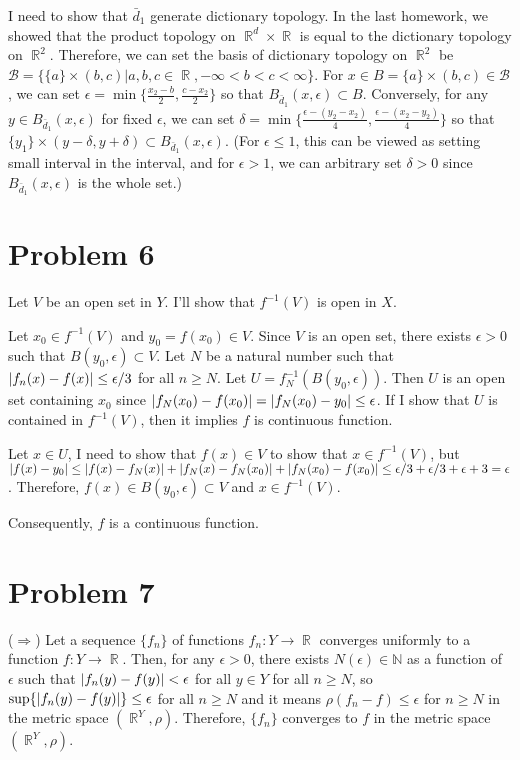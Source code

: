\documentclass{article}
\DeclareMathOperator{\rr}{\mathbb{R}}
\DeclarePairedDelimiter\abs{\lvert}{\rvert}%
\newcommand{\B}{\mathcal{B}}
\begin{document}
I need to show that $\bar{d}_1$ generate dictionary topology. In the last homework, we showed that the product topology on $\rr^d\times \rr$ is equal to the dictionary topology on $\rr^2$. Therefore, we can set the basis of dictionary topology on $\rr^2$ be $\B=\{\{a\}\times(b,c)|a,b,c\in\rr, -\infty<b<c<\infty\}$. For $x\in B=\{a\}\times(b,c)\in \B$, we can set $\epsilon=\min\{\frac{x_2-b}{2}, \frac{c-x_2}{2}\}$ so that $B_{\bar{d}_1}(x, \epsilon)\subset B$. Conversely, for any $y\in B_{\bar{d}_1}(x, \epsilon)$ for fixed $\epsilon$, we can set $\delta=\min\{\frac{\epsilon-(y_2-x_2)}{4}, \frac{\epsilon-(x_2-y_2)}{4}\}$ so that $\{y_1\}\times (y-\delta, y+\delta)\subset B_{\bar{d}_1}(x, \epsilon)$. (For $\epsilon\leq 1$, this can be viewed as setting small interval in the interval, and for $\epsilon>1$, we can arbitrary set $\delta>0$ since $B_{\bar{d}_1}(x, \epsilon)$ is the whole set.)

\section*{Problem 6}
Let $V$ be an open set in $Y$. I'll show that $f^{-1}(V)$ is open in $X$.

Let $x_0\in f^{-1}(V)$ and $y_0=f(x_0)\in V$. Since $V$ is an open set, there exists $\epsilon>0$ such that $B(y_0, \epsilon)\subset V$. Let $N$ be a natural number such that $\abs{f_n(x)-f(x)}\leq \epsilon/3$ for all $n\geq N$. Let $U=f^{-1}_N (B(y_0, \epsilon))$. Then $U$ is an open set containing $x_0$ since $\abs{f_N(x_0)-f(x_0)}=\abs{f_N(x_0)-y_0}\leq \epsilon$. If I show that $U$ is contained in $f^{-1}(V)$, then it implies $f$ is continuous function.

Let $x\in U$, I need to show that $f(x)\in V$ to show that $x\in f^{-1}(V)$, but $\abs{f(x)-y_0}\leq \abs{f(x)-f_N(x)}+\abs{f_N(x)-f_N(x_0)}+\abs{f_N(x_0)-f(x_0)}\leq \epsilon/3+\epsilon/3+\epsilon+3=\epsilon$. Therefore, $f(x)\in B(y_0,\epsilon)\subset V$ and $x\in f^{-1}(V)$.

Consequently, $f$ is a continuous function.
\section*{Problem 7}
($\Rightarrow$) Let a sequence $\{f_n\}$ of functions $f_n:Y\rightarrow\rr$ converges uniformly to a function $f:Y\rightarrow\rr$. Then, for any $\epsilon>0$, there exists $N(\epsilon)\in \mathbb{N}$ as a function of $\epsilon$ such that $\abs{f_n(y)-f(y)}< \epsilon$ for all $y\in Y$ for all $n\geq N$, so $\sup\{\abs{f_n(y)-f(y)}\}\leq \epsilon$ for all $n\geq N$ and it means $\rho(f_n-f)\leq \epsilon$ for $n\geq N$ in the metric space $(\rr^Y, \rho)$. Therefore, $\{f_n\}$ converges to $f$ in the metric space $(\rr^Y, \rho)$.
\end{document}
